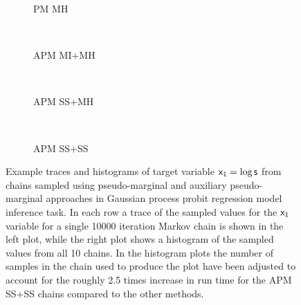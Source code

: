 \begin{figure}
\centering
\begin{subfigure}[b]{\linewidth}
\centering
  \vspace{-5mm}
  \caption{\ac{PM} \ac{MH}}
  \label{sfig:pmmh-gaussian-process-x0-trace}
\end{subfigure}
\\[3mm]
\begin{subfigure}[b]{\linewidth}
\centering
  \vspace{-5mm}
  \caption{\ac{APM} \ac{MI}+\ac{MH}}
  \label{sfig:apm-mi-mh-gaussian-process-x0-trace}
\end{subfigure}
\\[3mm]
\begin{subfigure}[b]{\linewidth}
\centering
  \vspace{-5mm}
  \caption{\ac{APM} \ac{SS}+\ac{MH}}
  \label{sfig:apm-ss-mh-gaussian-process-x0-trace}
\end{subfigure}
\\[3mm]
\begin{subfigure}[b]{\linewidth}
\centering
  \vspace{-5mm}
  \caption{\ac{APM} \ac{SS}+\ac{SS}}
  \label{sfig:apm-ss-ss-gaussian-process-x0-trace}
\end{subfigure}
\caption[Gaussian process probit regression traces.]{
Example traces and histograms of target variable $\mathsf{x}_1 = \log\mathsf{s}$ from chains sampled using pseudo-marginal and auxiliary pseudo-marginal approaches in Gaussian process probit regression model inference task. In each row a trace of the sampled values for the $\mathsf{x}_1$ variable for a single 10000 iteration Markov chain is shown in the left plot, while the right plot shows a histogram of the sampled values from all 10 chains. In the histogram plots the number of samples in the chain used to produce the plot have been adjusted to account for the roughly 2.5 times increase in run time for the \ac{APM} \ac{SS}+\ac{SS} chains compared to the other methods.}
\label{fig:pm-gaussian-process-traces}
\end{figure}


